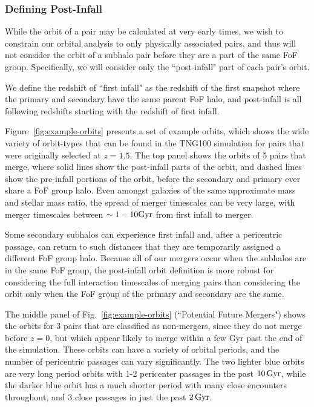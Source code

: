 \documentclass[twocolumn,linenumbers]{aastex631}
\begin{document}
\subsubsection{Defining Post-Infall}
While the orbit of a pair may be calculated at very early times, we wish to constrain our orbital analysis to only physically associated pairs, and thus will not consider the orbit of a subhalo pair before they are a part of the same FoF group. Specifically, we will consider only the ``post-infall" part of each pair's orbit. 

We define the redshift of ``first infall" as the redshift of the first snapshot where the primary and secondary have the same parent FoF halo, and post-infall is all following redshifts starting with the redshift of first infall. 

Figure~\ref{fig:example-orbits} presents a set of example orbits, which shows the wide variety of orbit-types that can be found in the TNG100 simulation for pairs that were originally selected at $z=1.5$. 
The top panel shows the orbits of 5 pairs that merge, where solid lines show the post-infall parts of the orbit, and dashed lines show the pre-infall portions of the orbit, before the secondary and primary ever share a FoF group halo. 
Even amongst galaxies of the same approximate mass and stellar mass ratio, the spread of merger timescales can be very large, with merger timescales between $\sim1-10\mathrm{Gyr}$ from first infall to merger. 

Some secondary subhalos can experience first infall and, after a pericentric passage, can return to such distances that they are temporarily assigned a different FoF group halo. 
Because all of our mergers occur when the subhalos are in the same FoF group, the
post-infall orbit definition is more robust for considering the full interaction timescales of merging pairs than considering the orbit only when the FoF group of the primary and secondary are the same. 

The middle panel of Fig.~\ref{fig:example-orbits} (``Potential Future Mergers") shows the orbits for 3 pairs that are classified as non-mergers, since they do not merge before $z=0$, but which appear likely to merge within a few Gyr past the end of the simulation. 
These orbits can have a variety of orbital periods, and the number of pericentric passages can vary significantly. 
The two lighter blue orbits are very long period orbits with 1-2 pericenter passages in the past $10\,\mathrm{Gyr}$, while the darker blue orbit has a much shorter period with many close encounters throughout, and 3 close passages in just the past $2\,\mathrm{Gyr}$.
\end{document}
